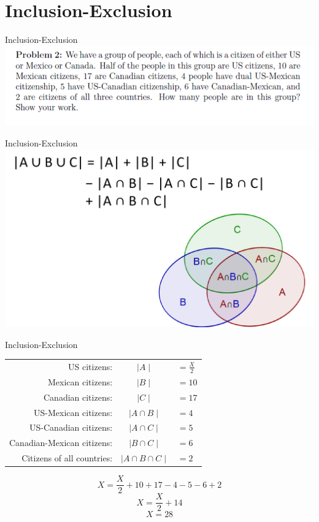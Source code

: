 \documentclass{beamer}
\begin{document}
\section{Inclusion-Exclusion }

\begin{frame}{Inclusion-Exclusion}
    \centering
    \includegraphics[width=.7\linewidth]{3.PNG}
\end{frame}
\begin{frame}{Inclusion-Exclusion}
    \centering
    \includegraphics[width=.7\linewidth]{4.PNG}
\end{frame}

\begin{frame}{Inclusion-Exclusion}
    \centering
    \begin{tabular}{r c l}
    US citizens:                & $\mid A \mid$                & $= \frac{X}{2}$    \\
    Mexican citizens:           & $\mid B \mid$                & $= 10$             \\
    Canadian citizens:          & $\mid C \mid$                & $= 17$             \\
    US-Mexican citizens:        & $\mid A \cap B \mid$         & $= 4$              \\
    US-Canadian citizens:       & $\mid A \cap C \mid$         & $= 5$              \\
    Canadian-Mexican citizens:  & $\mid B \cap C \mid$         & $= 6$              \\
    Citizens of all countries:  & $\mid A \cap B \cap C \mid$  & $= 2$              \\
    \end{tabular}

    $$X = \frac{X}{2} + 10 + 17 - 4 - 5 - 6 + 2$$
    $$X = \frac{X}{2} + 14$$
    $$X = 28$$

\end{frame}
\end{document}
